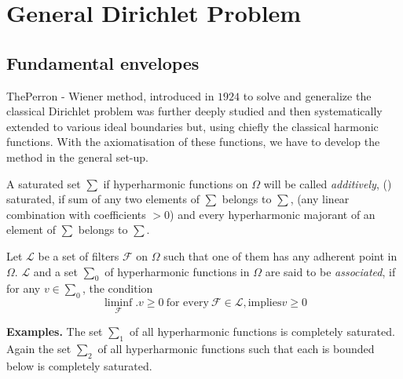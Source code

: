 \chapter{General Dirichlet Problem}\label{p4:chap5}%

\setcounter{section}{21}
\section{Fundamental envelopes}\label{p4:chap5:sec22} %

The\pageoriginale Perron - Wiener method, introduced in $1924$ to solve and
generalize the classical Dirichlet problem was further deeply studied
and then systematically extended to various ideal boundaries but,
using chiefly the classical harmonic functions. With the
axiomatisation of these functions, we have to develop the method in
the general set-up. 

\begin{defn}\label{p4:chap5:sec22:def15} %
  A saturated set $\sum$ if hyperharmonic functions on $\Omega$ will
  be called {\em additively}, () saturated, if
  sum of any two elements of $\sum$ belongs to $\sum$, (\resp any
  linear combination with coefficients $> 0$) and every hyperharmonic
  majorant of an element of $\sum$ belongs to $\sum$. 
\end{defn}

\begin{defn}\label{p4:chap5:sec22:def16} %
  Let $\mathscr{L}$ be a set of filters $\mathscr{F}$ on $\Omega$ such
  that one of them has any adherent point in $\Omega$. $\mathscr{L}$
  and a set $\sum_{0}$ of hyperharmonic functions in $\Omega$ are said
  to be {\em associated}, if for any $v \in \sum_0$, the condition 
  $$
  \liminf_{\mathscr{F}}. v\ge 0 ~\text{for every}~ \mathscr{F} \in
  \mathscr{L}, \text{implies} v \ge 0 
  $$
\end{defn}

\medskip
\noindent\textbf{Examples.}
  The set $\sum_1$ of all hyperharmonic functions is completely
  saturated. Again the set $\sum_2$ of all hyperharmonic functions
  such that each is bounded below is completely saturated. 

